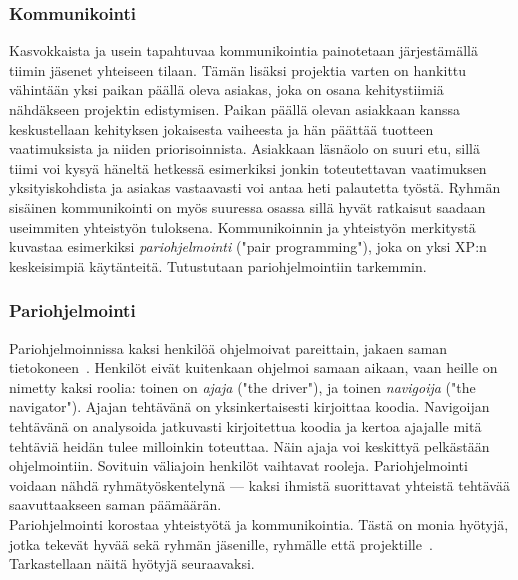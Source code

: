 \documentclass[finnish]{../tktltiki2}
\theoremstyle{definition}
\theoremstyle{remark}
\begin{document}
\subsubsection{Kommunikointi}

Kasvokkaista ja usein tapahtuvaa kommunikointia painotetaan järjestämällä tiimin jäsenet yhteiseen tilaan. Tämän lisäksi projektia varten on hankittu vähintään yksi paikan päällä oleva asiakas, joka on osana kehitystiimiä nähdäkseen projektin edistymisen. Paikan päällä olevan asiakkaan kanssa keskustellaan kehityksen jokaisesta vaiheesta ja hän päättää tuotteen vaatimuksista ja niiden priorisoinnista. Asiakkaan läsnäolo on suuri etu, sillä tiimi voi kysyä häneltä hetkessä esimerkiksi jonkin toteutettavan vaatimuksen yksityiskohdista ja asiakas vastaavasti voi antaa heti palautetta työstä. Ryhmän sisäinen kommunikointi on myös suuressa osassa sillä hyvät ratkaisut saadaan useimmiten yhteistyön tuloksena. Kommunikoinnin ja yhteistyön merkitystä kuvastaa esimerkiksi \emph{pariohjelmointi} ("pair 
programming"), joka on yksi XP:n keskeisimpiä käytänteitä.
Tutustutaan pariohjelmointiin tarkemmin.

\subsubsection{Pariohjelmointi}

Pariohjelmoinnissa kaksi henkilöä ohjelmoivat pareittain, jakaen saman 
tietokoneen~\cite{Shore:2007:AAD:1407480}. Henkilöt eivät kuitenkaan ohjelmoi samaan aikaan, vaan 
heille on 
nimetty kaksi roolia: toinen on \emph{ajaja} ("the driver"), ja toinen 
\emph{navigoija} ("the navigator"). Ajajan tehtävänä on 
yksinkertaisesti 
kirjoittaa koodia. Navigoijan tehtävänä on analysoida jatkuvasti 
kirjoitettua koodia ja kertoa ajajalle mitä tehtäviä heidän tulee 
milloinkin 
toteuttaa. Näin ajaja voi keskittyä pelkästään ohjelmointiin. Sovituin 
väliajoin henkilöt vaihtavat rooleja. Pariohjelmointi voidaan nähdä 
ryhmätyöskentelynä --- kaksi ihmistä suorittavat yhteistä tehtävää 
saavuttaakseen saman päämäärän.\\

Pariohjelmointi korostaa yhteistyötä ja kommunikointia. Tästä on monia 
hyötyjä, jotka tekevät hyvää sekä ryhmän jäsenille, ryhmälle että 
projektille~\cite{Begel:2008:PPW:1414004.1414026}. Tarkastellaan näitä 
hyötyjä seuraavaksi. 
\end{document}
